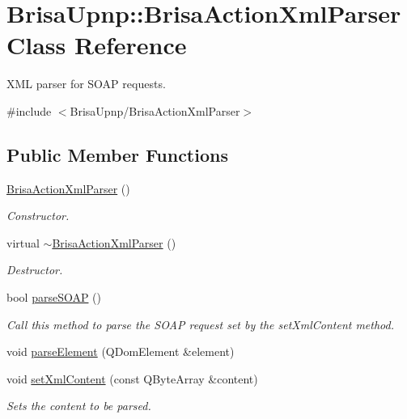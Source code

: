 \hypertarget{classBrisaUpnp_1_1BrisaActionXmlParser}{
\section{BrisaUpnp::BrisaActionXmlParser Class Reference}
\label{classBrisaUpnp_1_1BrisaActionXmlParser}
}


XML parser for SOAP requests.  


{\ttfamily \#include $<$BrisaUpnp/BrisaActionXmlParser$>$}\subsection*{Public Member Functions}
\begin{DoxyCompactItemize}
\item 
\hyperlink{classBrisaUpnp_1_1BrisaActionXmlParser_aa5a6085184cf85e2a6e9f0227a448eb9}{BrisaActionXmlParser} ()
\begin{DoxyCompactList}\small\item\em Constructor. \item\end{DoxyCompactList}\item 
virtual \hyperlink{classBrisaUpnp_1_1BrisaActionXmlParser_a29d3e806481a99c1cfd9007bbf3f09c1}{$\sim$BrisaActionXmlParser} ()
\begin{DoxyCompactList}\small\item\em Destructor. \item\end{DoxyCompactList}\item 
bool \hyperlink{classBrisaUpnp_1_1BrisaActionXmlParser_a95da43fde3ebe9601a08b6a2d8ca56ac}{parseSOAP} ()
\begin{DoxyCompactList}\small\item\em Call this method to parse the SOAP request set by the setXmlContent method. \item\end{DoxyCompactList}\item 
void \hyperlink{classBrisaUpnp_1_1BrisaActionXmlParser_a0e9a584388baa3a61d34a4adbcbf811b}{parseElement} (QDomElement \&element)
\item 
void \hyperlink{classBrisaUpnp_1_1BrisaActionXmlParser_a39f1a93ab753a93974a649f590ff03d6}{setXmlContent} (const QByteArray \&content)
\begin{DoxyCompactList}\small\item\em Sets the content to be parsed. \item\end{DoxyCompactList}\end{DoxyCompactItemize}
